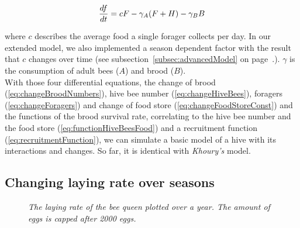 	\begin{equation}\label{eq:changeFoodStoreConst}
		{df \over dt} = c F - \gamma_A (F+H) - \gamma_B B
	\end{equation}
         
	where $c$ describes the average food a single forager collects per day. In our extended model, we also implemented a season dependent factor with the result that $c$ changes over time (see subsection~\ref{subsec:advancedModel} on page~\pageref{subsec:advancedModel}.). $\gamma$ is the consumption of adult bees ($A$) and brood ($B$).\\
	With those four differential equations, the change of brood (\ref{eq:changeBroodNumbers}), hive bee number (\ref{eq:changeHiveBees}), foragers (\ref{eq:changeForagers}) and change of food store (\ref{eq:changeFoodStoreConst}) and the functions of the brood survival rate, correlating to the hive bee number and the food store (\ref{eq:functionHiveBeesFood}) and a recruitment function (\ref{eq:recruitmentFunction}), we can simulate a basic model of a hive with its interactions and changes. So far, it is identical with \textit{Khoury's} model.
	
	\subsection{Changing laying rate over seasons}
		\begin{figure}
			\centering
			\caption{\textit{The laying rate of the bee queen plotted over a year. The amount of eggs is capped after 2000 eggs. }}
			\label{fig:dynLayingRate}
		\end{figure}
		
